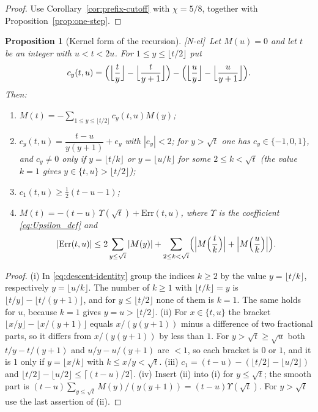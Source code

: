 \documentclass[11pt,reqno]{amsart}
\numberwithin{equation}{section}
\theoremstyle{plain}
\newtheorem{proposition}[theorem]{Proposition}
\theoremstyle{definition}
\theoremstyle{remark}
\newcommand{\tagNE}{\textup{[N-el]}}
\begin{document}
\begin{proof}
Use Corollary~\ref{cor:prefix-cutoff} with $\chi=5/8$, together with
Proposition~\ref{prop:one-step}.
\end{proof}

\begin{proposition}[Kernel form of the recursion]
\label{prop:kernel}
\tagNE\ Let $M(u)=0$ and let $t$ be an integer with $u<t<2u$. For $1\le y\le\lfloor t/2\rfloor$ put
\begin{equation}
c_y(t,u)=\Bigl(\Bigl\lfloor\frac ty\Bigr\rfloor-\Bigl\lfloor\frac t{y+1}\Bigr\rfloor\Bigr)
-\Bigl(\Bigl\lfloor\frac uy\Bigr\rfloor-\Bigl\lfloor\frac u{y+1}\Bigr\rfloor\Bigr).
\end{equation}
Then:
\begin{enumerate}[label=\textup{(\roman*)}]
\item $M(t)=-\sum_{1\le y\le\lfloor t/2\rfloor}c_y(t,u)M(y)$;
\item $c_y(t,u)=\dfrac{t-u}{y(y+1)}+e_y$ with $|e_y|<2$; for $y>\sqrt t$
one has $c_y\in\{-1,0,1\}$, and $c_y\ne0$ only if $y=\lfloor t/k\rfloor$ or
$y=\lfloor u/k\rfloor$ for some $2\le k<\sqrt t$ (the value $k=1$ gives $y\in\{t,u\}>\lfloor t/2\rfloor$);
\item $c_1(t,u)\ge\frac12(t-u-1)$;
\item $M(t)=-(t-u)\,\Upsilon(\sqrt t)+\mathrm{Err}(t,u)$, where $\Upsilon$ is the
coefficient \eqref{eq:Upsilon_def} and
\begin{equation}
|\mathrm{Err}(t,u)|\le2\sum_{y\le\sqrt t}|M(y)|
+\sum_{2\le k<\sqrt t}\Bigl(\Bigl|M\Bigl(\frac tk\Bigr)\Bigr|+\Bigl|M\Bigl(\frac uk\Bigr)\Bigr|\Bigr).
\end{equation}
\end{enumerate}
\end{proposition}

\begin{proof}
(i) In \eqref{eq:descent-identity} group the indices $k\ge2$ by the value
$y=\lfloor t/k\rfloor$, respectively $y=\lfloor u/k\rfloor$. The number of
$k\ge1$ with $\lfloor t/k\rfloor=y$ is
$\lfloor t/y\rfloor-\lfloor t/(y+1)\rfloor$, and for $y\le\lfloor t/2\rfloor$ none of them
is $k=1$. The same holds for $u$, because $k=1$ gives $y=u>\lfloor t/2\rfloor$. (ii) For $x\in\{t,u\}$ the bracket
$\lfloor x/y\rfloor-\lfloor x/(y+1)\rfloor$ equals $x/(y(y+1))$ minus a
difference of two fractional parts, so it differs from $x/(y(y+1))$ by less
than $1$. For $y>\sqrt t\ge\sqrt u$ both
$t/y-t/(y+1)$ and $u/y-u/(y+1)$ are $<1$, so each bracket is $0$ or $1$, and
it is $1$ only if $y=\lfloor x/k\rfloor$ with $k\le x/y<\sqrt t$.
(iii) $c_1=(t-u)-(\lfloor t/2\rfloor-\lfloor u/2\rfloor)$ and
$\lfloor t/2\rfloor-\lfloor u/2\rfloor\le\lceil(t-u)/2\rceil$.
(iv) Insert (ii) into (i) for $y\le\sqrt t$; the smooth part is
$(t-u)\sum_{y\le\sqrt t}M(y)/(y(y+1))=(t-u)\Upsilon(\sqrt t)$. For
$y>\sqrt t$ use the last assertion of (ii).
\end{proof}
\end{document}
